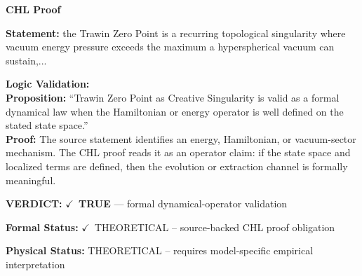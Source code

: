 \vspace{0.45em}
\noindent\textbf{CHL Proof}\par
\textbf{Statement:} the Trawin Zero Point is a recurring topological singularity where vacuum energy
pressure exceeds the maximum a hyperspherical vacuum can sustain,...

\textbf{Logic Validation:}\\
\textbf{Proposition:} ``Trawin Zero Point as Creative Singularity is valid as a formal dynamical law when the
Hamiltonian or energy operator is well defined on the stated state space.''\\
\textbf{Proof:} The source statement identifies an energy, Hamiltonian, or vacuum-sector mechanism. The
CHL proof reads it as an operator claim: if the state space and localized terms are
defined, then the evolution or extraction channel is formally meaningful.

\textbf{VERDICT:} \ensuremath{\checkmark}\ \textbf{TRUE} --- formal dynamical-operator validation

\textbf{Formal Status:} \ensuremath{\checkmark}\ THEORETICAL -- source-backed CHL proof obligation

\textbf{Physical Status:} THEORETICAL -- requires model-specific empirical interpretation
\par\vspace{0.45em}
\par
\ifTZPDarkEdition
{}
\fi
\endgroup
\endgroup
